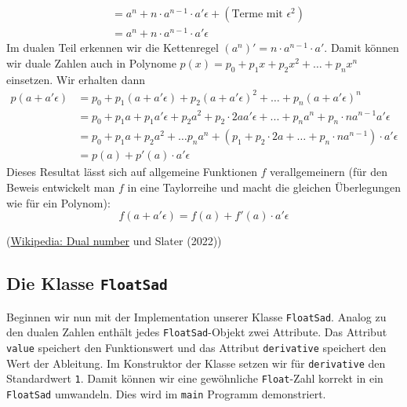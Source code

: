 \documentclass[
  letterpaper,
  DIV=11,
  oneside]{scrreprt}
\theoremstyle{definition}
\theoremstyle{definition}
\theoremstyle{remark}
\begin{document}
\begin{tcolorbox}
\[\begin{align}
    &= a^n + n \cdot a^{n-1} \cdot a'\epsilon + (\textrm{Terme mit }\epsilon^2) \\ 
    &= a^n + n \cdot a^{n-1} \cdot a' \epsilon
\end{align}
\] Im dualen Teil erkennen wir die Kettenregel
\((a^n)' = n\cdot a^{n-1}\cdot a'\). Damit können wir duale Zahlen auch
in Polynome \(p(x) = p_0 + p_1 x + p_2 x^2 + \ldots + p_n x^n\)
einsetzen. Wir erhalten dann \[
\begin{align}
    p(a+a'\epsilon) &= p_0 + p_1 (a+a'\epsilon) + p_2 (a+a'\epsilon)^2 + \ldots + p_n (a+a'\epsilon)^n \\ 
    &= p_0 + p_1 a + p_1 a'\epsilon + p_2 a^2 + p_2 \cdot 2a a' \epsilon + ... + p_n a^n + p_n \cdot n a^{n-1} a' \epsilon \\ 
    &= p_0 + p_1 a + p_2 a^2 + \ldots p_n a^n + (p_1 + p_2 \cdot 2a + \ldots + p_n \cdot n a^{n-1}) \cdot a' \epsilon \\
    &= p(a) + p'(a) \cdot a'\epsilon
\end{align}
\] Dieses Resultat lässt sich auf allgemeine Funktionen \(f\)
verallgemeinern (für den Beweis entwickelt man \(f\) in eine Taylorreihe
und macht die gleichen Überlegungen wie für ein Polynom): \[
f(a+a'\epsilon) = f(a) + f'(a)\cdot a'\epsilon
\]

(\href{https://en.wikipedia.org/wiki/Dual_number}{Wikipedia: Dual
number} und Slater (2022))

\end{tcolorbox}

\hypertarget{sec-FoatSadClassDescription}{%
\subsection{\texorpdfstring{Die Klasse
\texttt{FloatSad}}{Die Klasse FloatSad}}\label{sec-FoatSadClassDescription}}

Beginnen wir nun mit der Implementation unserer Klasse
\texttt{FloatSad}. Analog zu den dualen Zahlen enthält jedes
\texttt{FloatSad}-Objekt zwei Attribute. Das Attribut \texttt{value}
speichert den Funktionswert und das Attribut \texttt{derivative}
speichert den Wert der Ableitung. Im Konstruktor der Klasse setzen wir
für \texttt{derivative} den Standardwert \texttt{1}. Damit können wir
eine gewöhnliche \texttt{Float}-Zahl korrekt in ein \texttt{FloatSad}
umwandeln. Dies wird im \texttt{main} Programm demonstriert.
\end{document}
